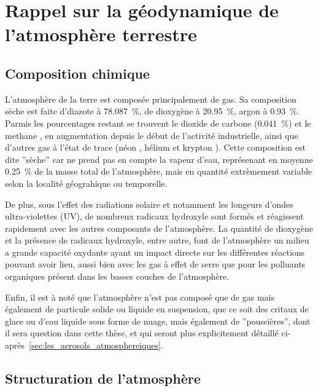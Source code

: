 
\section{Rappel sur la géodynamique de l'atmosphère terrestre}%
\label{sec:structure_atmosphere}

\subsection{Composition chimique}%
\label{ssub:composition_chimique}

L'atmosphère de la terre est composée principalement de gas. Sa composition sèche est
faite d'diazote  à \SI{78.087}{\percent}, de dioxygène  à
\SI{20.95}{\percent}, argon  à \SI{0.93}{\percent}. Parmis les pourcentages restant
se trouvent le dioxide de carbone  (\SI{0.041}{\percent}) et le methane ,
en augmentation depuis le début de l'activité industrielle, ainsi que d'autres gas à
l'état de trace (néon , hélium  et krypton ).  Cette composition est
dite ''sèche'' car ne prend pas en compte la vapeur d'eau, représenant en moyenne 
\SI{0.25}{\percent} de la masse total de l'atmosphère, mais en quantité extrèmement
variable selon la localité géograhique ou temporelle.

De plus, sous l'effet des radiations solaire et notamment les longeurs d'ondes
ultra-violettes (UV), de nombreux radicaux hydroxyle  sont formés et réagissent
rapidement avec les autres composants de l'atmosphère.  La quantité de dioxygène et la
présence de radicaux hydroxyle, entre autre, font de l'atmosphère un milieu a grande
capacité oxydante ayant un impact directe sur les différentes réactions pouvant avoir lieu,
aussi bien avec les gas à effet de serre que pour les polluants organiques présent dans
les basses couches de l'atmosphère.

Enfin, il est à noté que l'atmosphère n'est pas composé que de gas mais également de
particule solide ou liquide en suspension, que ce soit des critaux de glace ou d'eau
liquide sous forme de nuage, mais également de ''poussières'', dont il sera question dans
cette thèse, et qui seront plus explicitement détaillé
ci-après~\ref{sec:les_aerosols_atmosphereiques}.

\subsection{Structuration de l'atmosphère}%
\label{sub:structuration_de_l_atmosphere}

